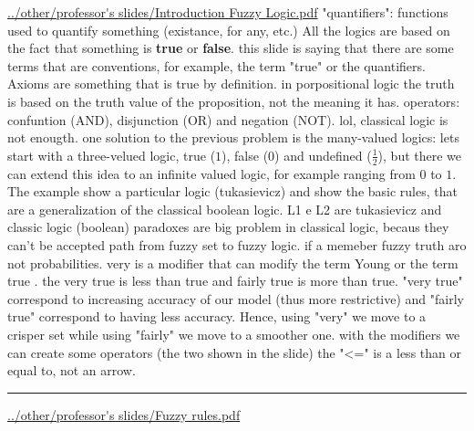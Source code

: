 \newline
\url{../other/professor's slides/Introduction Fuzzy Logic.pdf}\newline
\newline
[2] "quantifiers": functions used to quantify something (existance, for any, etc.)\newline
All the logics are based on the fact that something is \textbf{true} or \textbf{false}.\newline
\newline
[3] this slide is saying that there are some terms that are conventions, for example, the term "true" or the quantifiers.\newline
Axioms are something that is true by definition.\newline
\newline
[4] in porpositional logic the truth is based on the truth value of the proposition, not the meaning it has.\newline
\newline
[5] operators: confuntion (AND), disjunction (OR) and negation (NOT).\newline
\newline
[8] lol, classical logic is not enougth. \newline
\newline
[9] one solution to the previous problem is the many-valued logics: lets start with a three-velued logic, true ($1$), false ($0$) and undefined ($\frac{1}{2}$), but there we can extend this idea to an infinite valued logic, for example ranging from $0$ to $1$.\newline
The example show a particular logic (tukasievicz) and show the basic rules, that are a generalization of the classical boolean logic.\newline
\newline
[10] L1 e L2 are tukasievicz and classic logic (boolean)\newline
\newline
[11] paradoxes are big problem in classical logic, becaus they can't be accepted \newline
\newline
[14-15] path from fuzzy set to fuzzy logic. if a memeber \newline
\newline
[16] fuzzy truth aro not probabilities.\newline
\newline
[17] very is a modifier that can modify the term Young or the term true . the very true is less than true and fairly true is more than true. "very true" correspond to increasing accuracy of our model (thus more restrictive) and "fairly true" correspond to having less accuracy. Hence, using "very" we move to a crisper set while using "fairly" we move to a smoother one. \newline
\newline
[18] with the modifiers we can create some operators (the two shown in the slide)\newline
\newline
[19] the "<=" is a less than or equal to, not an arrow.\newline
\newline
\rule{\textwidth}{0,4pt}
\url{../other/professor's slides/Fuzzy rules.pdf}\newline
\newline
[...]
